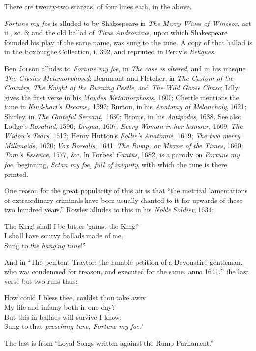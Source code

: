 

There are twenty-two stanzas, of four lines each, in the above.

\textit{Fortune my foe} is alluded to by Shakespeare in \textit{The Merry Wives of Windsor},
act ii., sc. 3; and the old ballad of \textit{Titus Andronicus}, upon which Shakespeare
founded his play of the same name, was sung to the tune. A copy of that ballad
is in the Roxburghe Collection, i. 392, and reprinted in Percy’s \textit{Reliques}.

Ben Jonson alludes to \textit{Fortune my foe}, in \textit{The case is altered}, and in his masque
\textit{The Gipsies Metamorphosed}; Beaumont and Fletcher, in \textit{The Custom of the
Country}, \textit{The Knight of the Burning Pestle}, and \textit{The Wild Goose Chase}; Lilly
gives the first verse in his \textit{Maydes Metamorphosis}, 1600; Chettle mentions the
tune in \textit{Kind-hart's Dreame},~1592; Burton, in his \textit{Anatomy of Melancholy}, 1621;
Shirley, in \textit{The Grateful Servant},~1630; \pagebreak Brome, in his \textit{Antipodes}, 1638. See
also Lodge’s \textit{Rosalind}, 1590; \textit{Lingua}, 1607; \textit{Every Woman in her humour}, 1609;
\textit{The Widow’s Tears}, 1612; Henry Hutton’s \textit{Follie’s Anatomie}, 1619; \textit{The two
merry Milkmaids}, 1620; \textit{Vox Borealis}, 1641; \textit{The Rump, or Mirror of the
Times}, 1660; \textit{Tom’s Essence}, 1677, \&c. In Forbes’ \textit{Cantus}, 1682, is a parody
on \textit{Fortune my foe}, beginning, \textit{Satan my foe, full of iniquity}, with which the tune
is there printed.

One reason for the great popularity of this air is that “the metrical lamentations
of extraordinary criminals have been usually chanted to it for upwards of
these two hundred years.” Rowley alludes to this in his \textit{Noble Soldier}, 1634:
\settowidth{\versewidth}{The King! shall I be bitter ’gainst the King?}
\begin{scverse}
The King! shall I be bitter ’gainst the King?\\
I shall have scurvy ballads made of me,\\
Sung to \textit{the hanging tune}!”
\end{scverse}
And in “The penitent Traytor: the humble petition of a Devonshire gentleman,
who was condemned for treason, and executed for the same, anno 1641,” the
last verse but two runs thus:
\begin{scverse}
How could I bless thee, couldst thou take away\\
My life and infamy both in one day?\\
But this in ballads will survive I know,\\
Sung to that \textit{preaching tune, Fortune my foe}."
\end{scverse}
The last is from “Loyal Songs written against the Rump Parliament.”

